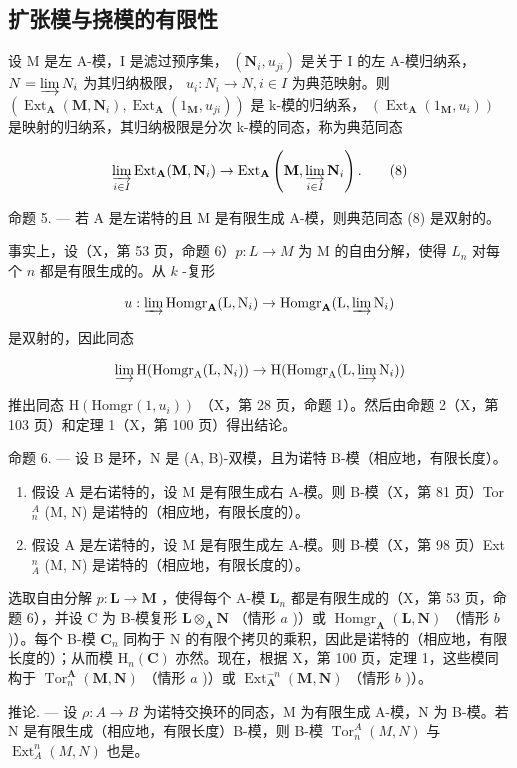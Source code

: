 \subsection{扩张模与挠模的有限性}

设 M 是左 A-模，I 是滤过预序集， \((\mathbf{N}_{i}, u_{ji})\) 是关于 I 的左 A-模归纳系， \(N = \varinjlim N_{i}\) 为其归纳极限， \(u_{i}: N_{i} \to N, i \in I\) 为典范映射。则 \((\operatorname{Ext}_{\mathbf{A}}(\mathbf{M}, \mathbf{N}_{i}), \operatorname{Ext}_{\mathbf{A}}(1_{\mathbf{M}}, u_{ji}))\) 是 k-模的归纳系， \((\operatorname{Ext}_{\mathbf{A}}(1_{\mathbf{M}}, u_{i}))\) 是映射的归纳系，其归纳极限是分次 k-模的同态，称为典范同态

\[
\varinjlim_ {i \in I} \operatorname{Ext} _ {\mathbf {A}} (\mathbf {M}, \mathbf {N} _ {i}) \rightarrow \operatorname{Ext} _ {\mathbf {A}} \left(\mathbf {M}, \varinjlim_ {i \in I} \mathbf {N} _ {i}\right).\tag{8}
\]

命题 5. --- 若 A 是左诺特的且 M 是有限生成 A-模，则典范同态 (8) 是双射的。

事实上，设（X，第 53 页，命题 6）\(p: L \to M\) 为 M 的自由分解，使得 \(L_{n}\) 对每个 \(n\) 都是有限生成的。从 \(k\) -复形

\[
u: \varinjlim \operatorname{Homgr} _ {\mathbf {A}} (\mathrm{L}, \mathrm{N} _ {i}) \rightarrow \operatorname{Homgr} _ {\mathbf {A}} (\mathrm{L}, \varinjlim \mathrm{N} _ {i})
\]

是双射的，因此同态

\[
\varinjlim \mathrm{H} (\operatorname{Homgr} _ {\mathrm{A}} (\mathrm{L}, \mathrm{N} _ {i})) \rightarrow \mathrm{H} (\operatorname{Homgr} _ {\mathrm{A}} (\mathrm{L}, \varinjlim \mathrm{N} _ {i}))
\]

推出同态 \(\mathrm{H}(\mathrm{Homgr}(1,u_{i}))\) （X，第 28 页，命题 1）。然后由命题 2（X，第 103 页）和定理 1（X，第 100 页）得出结论。

命题 6. --- 设 B 是环，N 是 (A, B)-双模，且为诺特 B-模（相应地，有限长度）。

\begin{enumerate}
\def\labelenumi{\alph{enumi})}
\item
  假设 A 是右诺特的，设 M 是有限生成右 A-模。则 B-模（X，第 81 页）Tor \(_{n}^{A}\) (M, N) 是诺特的（相应地，有限长度的）。
\item
  假设 A 是左诺特的，设 M 是有限生成左 A-模。则 B-模（X，第 98 页）Ext \(_{A}^{n}\) (M, N) 是诺特的（相应地，有限长度的）。
\end{enumerate}

选取自由分解 \(p: \mathbf{L} \to \mathbf{M}\) ，使得每个 A-模 \(\mathbf{L}_n\) 都是有限生成的（X，第 53 页，命题 6），并设 C 为 B-模复形 \(\mathbf{L} \otimes_{\mathbf{A}} \mathbf{N}\) （情形 \(a\) )）或 \(\operatorname{Homgr}_{\mathbf{A}}(\mathbf{L}, \mathbf{N})\) （情形 \(b\) )）。每个 B-模 \(\mathbf{C}_n\) 同构于 N 的有限个拷贝的乘积，因此是诺特的（相应地，有限长度的）；从而模 \(\mathrm{H}_n(\mathbf{C})\) 亦然。现在，根据 X，第 100 页，定理 1，这些模同构于 \(\operatorname{Tor}_n^{\mathbf{A}}(\mathbf{M}, \mathbf{N})\) （情形 \(a\) )）或 \(\operatorname{Ext}_{\mathbf{A}}^{-n}(\mathbf{M}, \mathbf{N})\) （情形 \(b\) )）。

推论. --- 设 \(\rho: A \to B\) 为诺特交换环的同态，M 为有限生成 A-模，N 为 B-模。若 N 是有限生成（相应地，有限长度）B-模，则 B-模 \(\operatorname{Tor}_{n}^{A}(M, N)\) 与 \(\operatorname{Ext}_{A}^{n}(M, N)\) 也是。

